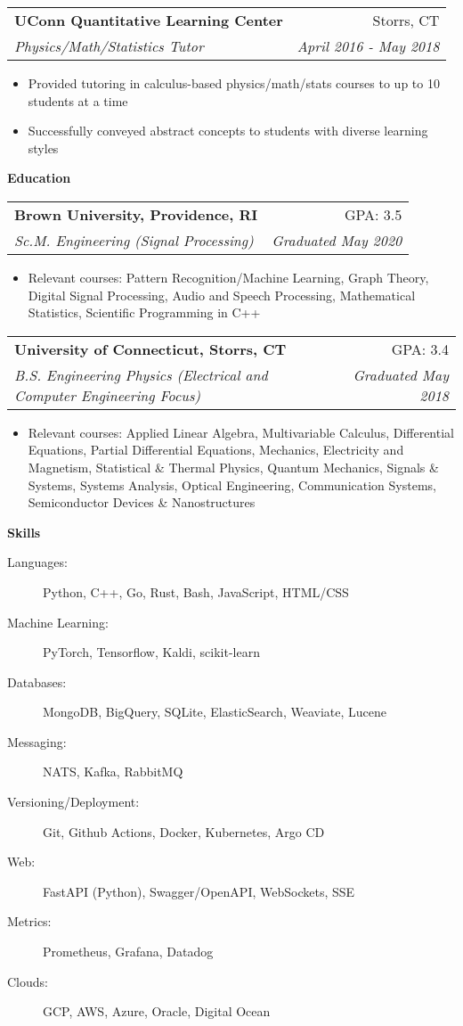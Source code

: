 \documentclass[letterpaper,11pt]{article}
\makeatletter
\newcommand{\resitem}[1]{\item #1 \vspace{-2pt}}
\newcommand{\resheading}[1]{{\large \colorbox{mygrey}{\begin{minipage}{\textwidth}{\textbf{#1 \vphantom{p\^{E}}}}\end{minipage}}}}
\newcommand{\ressubheading}[4]{
\begin{tabular*}{6.9in}{l@{\extracolsep{\fill}}r}
		\textbf{#1} & #2 \\
		\textit{#3} & \textit{#4} \\
\end{tabular*}\vspace{-6pt}}
\makeatother
\begin{document}
\begin{description}
\item
	\ressubheading{UConn Quantitative Learning Center}{Storrs, CT}{Physics/Math/Statistics Tutor}{April 2016 - May 2018}
	\begin{itemize}
		\resitem{Provided tutoring in calculus-based physics/math/stats courses to up to 10 students at a time}
		\resitem{Successfully conveyed abstract concepts to students with diverse learning styles}
	\end{itemize}
\end{description}


\resheading{Education}
\begin{description}
\item
	\ressubheading{Brown University, Providence, RI}{GPA: 3.5}{Sc.M. Engineering (Signal Processing)}{Graduated May 2020}
	\begin{itemize}
		\resitem{Relevant courses: Pattern Recognition/Machine Learning, Graph Theory, Digital Signal Processing, Audio and Speech Processing, Mathematical Statistics, Scientific Programming in C++}
	\end{itemize}

\item
	\ressubheading{University of Connecticut, Storrs, CT}{GPA: 3.4}{B.S. Engineering Physics (Electrical and Computer Engineering Focus)}{Graduated May 2018}
	\begin{itemize}
		\resitem{Relevant courses: Applied Linear Algebra, Multivariable Calculus, Differential Equations, Partial Differential Equations, Mechanics, Electricity and Magnetism, Statistical \& Thermal Physics, Quantum Mechanics, Signals \& Systems, Systems Analysis, Optical Engineering, Communication Systems, Semiconductor Devices \& Nanostructures}
	\end{itemize}

\end{description}

\resheading{Skills}
\begin{description}
    \item[Languages:]
    Python, C++, Go, Rust, Bash, JavaScript, HTML/CSS
    \item[Machine Learning:]
    PyTorch, Tensorflow, Kaldi, scikit-learn
    \item[Databases:]
    MongoDB, BigQuery, SQLite, ElasticSearch, Weaviate, Lucene
    \item[Messaging:]
    NATS, Kafka, RabbitMQ
    \item[Versioning/Deployment:]
    Git, Github Actions, Docker, Kubernetes, Argo CD
    \item[Web:]
    FastAPI (Python), Swagger/OpenAPI, WebSockets, SSE
    \item[Metrics:]
    Prometheus, Grafana, Datadog
    \item[Clouds:]
    GCP, AWS, Azure, Oracle, Digital Ocean
\end{description}
\end{document}
